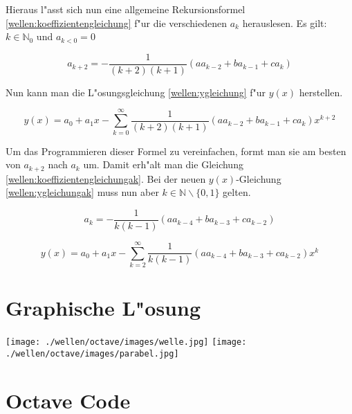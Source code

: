 \begin{refsection}
Hieraus l"asst sich nun eine allgemeine Rekursionsformel 
\ref{wellen:koeffizientengleichung} f"ur die verschiedenen $a_k$ herauslesen. 
Es gilt: $k \in \mathbb{N}_0$ und	$a_{k < 0} = 0$

\begin{equation}
	a_{k+2} = -\frac{1}{(k+2)(k+1)} (aa_{k-2}+ba_{k-1}+ca_k)
	\label{wellen:koeffizientengleichung}
\end{equation}

Nun kann man die L"osungsgleichung \ref{wellen:ygleichung} f"ur $y(x)$ 
herstellen.

\begin{equation}
	y(x) = a_0 + a_1x 
	-\sum_{k=0}^{\infty}\frac{1}{(k+2)(k+1)}(aa_{k-2}+ba_{k-1}+ca_k)x^{k+2}
	\label{wellen:ygleichung}
\end{equation}

Um das Programmieren dieser Formel zu vereinfachen, formt man sie am besten von 
$a_{k+2}$ nach $a_k$ um. Damit erh"alt man die Gleichung 
\ref{wellen:koeffizientengleichungak}.
Bei der neuen $y(x)$-Gleichung \ref{wellen:ygleichungak} muss nun aber $k \in 
\mathbb{N} \backslash \{0, 1\}$ gelten.

\begin{equation}
	a_{k} = -\frac{1}{k(k-1)} (aa_{k-4}+ba_{k-3}+ca_{k-2})
	\label{wellen:koeffizientengleichungak}
\end{equation}

\begin{equation}
	y(x) = a_0 + a_1x 
	-\sum_{k=2}^{\infty}\frac{1}{k(k-1)}(aa_{k-4}+ba_{k-3}+ca_{k-2})x^k
	\label{wellen:ygleichungak}
\end{equation}

\section{Graphische L"osung}
\texttt{[image: ./wellen/octave/images/welle.jpg]}
\texttt{[image: ./wellen/octave/images/parabel.jpg]}

\clearpage
\section{Octave Code}

\printbibliography[heading=subbibliography]
\end{refsection}